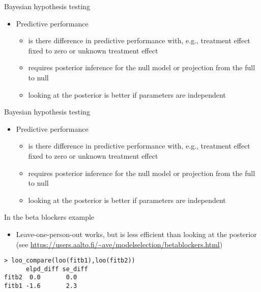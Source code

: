 \documentclass[english,t]{beamer}
\begin{document}
\begin{frame}[fragile]{Bayesian hypothesis testing}

  \begin{itemize}
  \item Predictive performance
    \begin{itemize}
    \item is there difference in predictive performance with, e.g.,
      treatment effect fixed to zero or unknown treatment effect
    \item requires posterior inference for the null model or
      projection from the full to null
    \item looking at the posterior is better if parameters are
      independent
    \end{itemize}
  \end{itemize}

\end{frame}

\begin{frame}{Bayesian hypothesis testing}

  \begin{itemize}
  \item Predictive performance
    \begin{itemize}
    \item is there difference in predictive performance with, e.g.,
      treatment effect fixed to zero or unknown treatment effect
    \item requires posterior inference for the null model or
      projection from the full to null
    \item looking at the posterior is better if parameters are
      independent
    \end{itemize}
  \end{itemize}

  In the beta blockers example
  \begin{itemize}
  \item Leave-one-person-out works, but is less efficient than looking
    at the posterior (see
    \url{https://users.aalto.fi/~ave/modelselection/betablockers.html})
  \end{itemize}

\begin{verbatim}
> loo_compare(loo(fitb1),loo(fitb2))
      elpd_diff se_diff
fitb2  0.0       0.0   
fitb1 -1.6       2.3   
\end{verbatim}

\end{frame}
\end{document}
